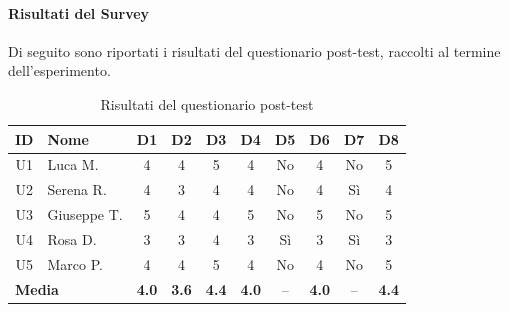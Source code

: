 \documentclass{article}
\begin{document}
\paragraph{Risultati del Survey}

Di seguito sono riportati i risultati del questionario post-test, 
raccolti al termine dell'esperimento.

\begin{table}[H]
\centering
\renewcommand{\arraystretch}{1.5}
\begin{tabular}{|c|l|c|c|c|c|c|c|c|c|}
\hline
\rowcolor[HTML]{010066}
{\color{white}\textbf{ID}} & {\color{white}\textbf{Nome}} & {\color{white}\textbf{D1}} & {\color{white}\textbf{D2}} & {\color{white}\textbf{D3}} & {\color{white}\textbf{D4}} & {\color{white}\textbf{D5}} & {\color{white}\textbf{D6}} & {\color{white}\textbf{D7}} & {\color{white}\textbf{D8}} \\
\hline
U1 & Luca M.     & 4 & 4 & 5 & 4 & No & 4 & No  & 5 \\ \hline
U2 & Serena R.   & 4 & 3 & 4 & 4 & No & 4 & Sì  & 4 \\ \hline
U3 & Giuseppe T. & 5 & 4 & 4 & 5 & No & 5 & No  & 5 \\ \hline
U4 & Rosa D.     & 3 & 3 & 4 & 3 & Sì & 3 & Sì  & 3 \\ \hline
U5 & Marco P.    & 4 & 4 & 5 & 4 & No & 4 & No  & 5 \\ \hline
\multicolumn{2}{|l|}{\textbf{Media}} & \textbf{4.0} & \textbf{3.6} & \textbf{4.4} & \textbf{4.0} & -- & \textbf{4.0} & -- & \textbf{4.4} \\ \hline
\end{tabular}
\caption{Risultati del questionario post-test}
\end{table}
\end{document}
